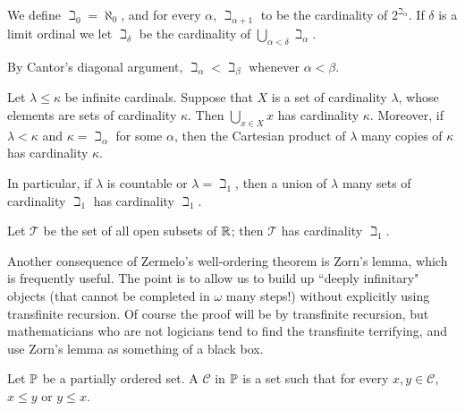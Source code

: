 \begin{definition}
\label{beth dfn}
We define $\beth_0 = \aleph_0$, and for every $\alpha$, $\beth_{\alpha + 1}$ to be the cardinality of $2^{\beth_\alpha}$.
If $\delta$ is a limit ordinal we let $\beth_\delta$ be the cardinality of $\bigcup_{\alpha < \delta} \beth_\alpha$.
\end{definition}

\begin{subsec}
By Cantor's diagonal argument, $\beth_{\alpha} < \beth_\beta$ whenever $\alpha < \beta$.
\end{subsec}

\begin{theorem}
\label{cardinal arithmetic trivial}
Let $\lambda \leq \kappa$ be infinite cardinals.
Suppose that $X$ is a set of cardinality $\lambda$, whose elements are sets of cardinality $\kappa$. Then $\bigcup_{x \in X} x$ has cardinality $\kappa$.
Moreover, if $\lambda < \kappa$ and $\kappa = \beth_\alpha$ for some $\alpha$, then the Cartesian product of $\lambda$ many copies of $\kappa$ has cardinality $\kappa$.
\end{theorem}

\begin{subsec}
In particular, if $\lambda$ is countable or $\lambda = \beth_1$, then a union of $\lambda$ many sets of cardinality $\beth_1$ has cardinality $\beth_1$.
\end{subsec}

\begin{theorem}
\label{cardinality of topology}
Let $\mathcal T$ be the set of all open subsets of $\mathbb{R}$; then $\mathcal T$ has cardinality $\beth_1$.
\end{theorem}

\begin{subsec}
Another consequence of Zermelo's well-ordering theorem is Zorn's lemma, which is frequently useful.
The point is to allow us to build up ``deeply infinitary" objects (that cannot be completed in $\omega$ many steps!) without explicitly using transfinite recursion.
Of course the proof will be by transfinite recursion, but mathematicians who are not logicians tend to find the transfinite terrifying, and use Zorn's lemma as something of a black box.
\end{subsec}

\begin{definition}
Let $\mathbb{P}$ be a partially ordered set. A  $\mathcal C$ in $\mathbb{P}$ is a set such that for every $x, y \in \mathcal C$, $x \leq y$ or $y \leq x$.
\end{definition}

